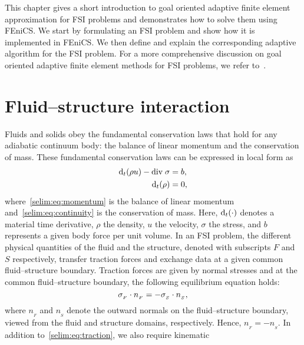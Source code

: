 This chapter gives a short introduction to goal oriented adaptive
finite element approximation for FSI problems and demonstrates how to
solve them using FEniCS. We start by formulating an FSI problem and
show how it is implemented in FEniCS. We then define and explain the
corresponding adaptive algorithm for the FSI problem. For a more
comprehensive discussion on goal oriented adaptive finite element
methods for FSI problems, we refer
to~\citet{SelimLogg2011a,Dunne2007,Dunne2006,
GratschBathe2006,BengzonLarson2010,ZeeBrummelenBorst2008a, Van2009}.


\section{Fluid--structure interaction}
\label{selim:sec:fsi}

Fluids and solids obey the fundamental conservation laws that hold
for any adiabatic continuum body: the balance of linear momentum and
the conservation of mass.  These fundamental conservation laws can be
expressed in local form as\vspace*{-2pt}
\begin{align}
\label{selim:eq:momentum}
\subdt(\rho u) - \divv \sigma &= b,\\
\label{selim:eq:continuity}
\subdt(\rho) &= 0,\vspace*{-2pt}
\end{align}
where~\eqref{selim:eq:momentum} is the balance of linear momentum
and~\eqref{selim:eq:continuity} is the conservation of mass.  Here,
$\textrm{d}_t(\cdot)$ denotes a material time derivative, $\rho$ the density,
$u$ the velocity, $\sigma$ the stress, and $b$ represents a given body
force per unit volume. In an FSI problem, the different physical
quantities of the fluid and the structure, denoted with subscripts
$F$ and $S$ respectively, transfer traction forces and exchange data
at a given common fluid--structure boundary.  Traction forces are
given by normal stresses and at the common fluid--structure boundary,
the following equilibrium equation holds:\vspace*{-2pt}
\begin{equation}
\label{selim:eq:traction}
\sigma_{_{F}}\cdot n_{_{F}} =  - \sigma_{_{S}}\cdot n_{_{S}},\vspace*{-2pt}
\end{equation}
where $n_{_{F}}$ and $n_{_{S}}$ denote the outward normals on the
fluid--structure boundary, viewed from the fluid and structure
domains, respectively. Hence, $n_{_{F}} = - n_{_{S}}$. \pagebreak In addition to~\eqref{selim:eq:traction}, we also require kinematic
